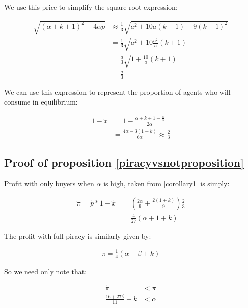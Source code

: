 \documentclass[12pt]{article}
\numberwithin{equation}{section}
\begin{document}
We use this price to simplify the square root expression: 

\begin{align*}
\sqrt{(\alpha+k+1)^2-4 \alpha p} &\approx \frac{1}{3} \sqrt{a^2+10 a (k+1)+9 (k+1)^2} \\
&= \frac{1}{3} \sqrt{a^2+10  \frac{a^2}{a} (k+1)} \\
&= \frac{a}{3} \sqrt{1+ \frac{10}{a} (k+1)} \\
&=  \frac{a}{3}
\end{align*}

We can use this expression to represent the proportion of agents who will consume in equilibrium:

\begin{align}
1-\tilde{x} &= 1-\frac{\alpha+k+1-\frac{a}{3}}{2 \alpha} \\
&=\frac{4\alpha-3(1+k)}{6\alpha}
\approx \frac{2}{3}
\end{align}


\subsection{Proof of proposition \ref{piracyvsnotproposition}}\label{piracyvsnot}

Profit with only buyers when $\alpha$ is high, taken from \ref{corollary1} is simply:

\begin{align*}
\tilde{\pi} =\tilde{p}*1-\tilde{x} & = \left(\frac{2\alpha}{9}+\frac{2(1+k)}{9} \right) \frac{2}{3} \\
& = \frac{4}{27} \left( \alpha + 1+k \right)
\end{align*}

The profit with full piracy is similarly given by:

\begin{align*}
\pi = \frac{1}{4} \left( \alpha - \beta + k \right)
\end{align*}

So we need only note that:

\begin{align*}
\tilde{\pi} &< \pi  \\
\frac{16 + 27 \beta}{11}-k & < \alpha \\ 
\end{align*}
\end{document}
